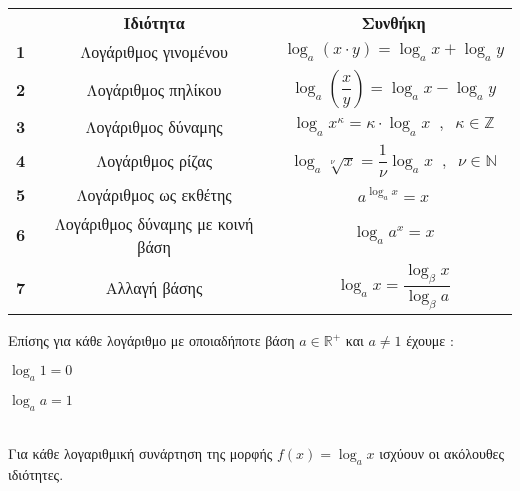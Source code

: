 \begin{center}
\begin{longtable}{ccc}
\hline \rule[-2ex]{0pt}{5.5ex} &\textbf{Ιδιότητα} & \textbf{Συνθήκη} \\
\hhline{===}\rule[-2ex]{0pt}{5.5ex} \textbf{1} & Λογάριθμος γινομένου & $ \log_{a}(x\cdot y)=\log_{a}x+\log_{a}y $ \\
\textbf{2} &\rule[-2ex]{0pt}{5.5ex}  Λογάριθμος πηλίκου & $ \log_{a}\left( \dfrac{x}{y}\right) =\log_{a}x-\log_{a}y $ \\
\textbf{3} &\rule[-2ex]{0pt}{5.5ex}  Λογάριθμος δύναμης & $ \log_{a}x^\kappa=\kappa\cdot\log_{a}x\;\;,\;\;\kappa\in\mathbb{Z} $ \\
\textbf{4} &\rule[-2ex]{0pt}{5.5ex}  Λογάριθμος ρίζας & $ \log_{a}\!\sqrt[\nu]{x}=\dfrac{1}{\nu}\log_{a}x\;\;,\;\;\nu\in\mathbb{N} $ \\
\textbf{5} &\rule[-2ex]{0pt}{5.5ex}  Λογάριθμος ως εκθέτης & $ a^{\log_{a}x}=x $ \\
\textbf{6} &\rule[-2ex]{0pt}{5.5ex}  Λογάριθμος δύναμης με κοινή βάση & $ \log_{a}a^x=x $ \\
\textbf{7} &\rule[-2ex]{0pt}{5.5ex}  Αλλαγή βάσης & $ \log_{a}x=\dfrac{\log_{\beta}{x}}{\log_{\beta}{a}} $ \\
\hline
\end{longtable}
\end{center}
Επίσης για κάθε λογάριθμο με οποιαδήποτε βάση $ a\in\mathbb{R}^+ $ και $ a\neq1 $ έχουμε :
\begin{multicols}{2}
\begin{rlist}
\item $ \log_{a}1=0 $
\item $ \log_{a}a=1 $
\end{rlist}
\end{multicols}\mbox{}\\
Για κάθε λογαριθμική συνάρτηση της μορφής $ f(x)=\log_{a}{x} $ ισχύουν οι ακόλουθες ιδιότητες.
